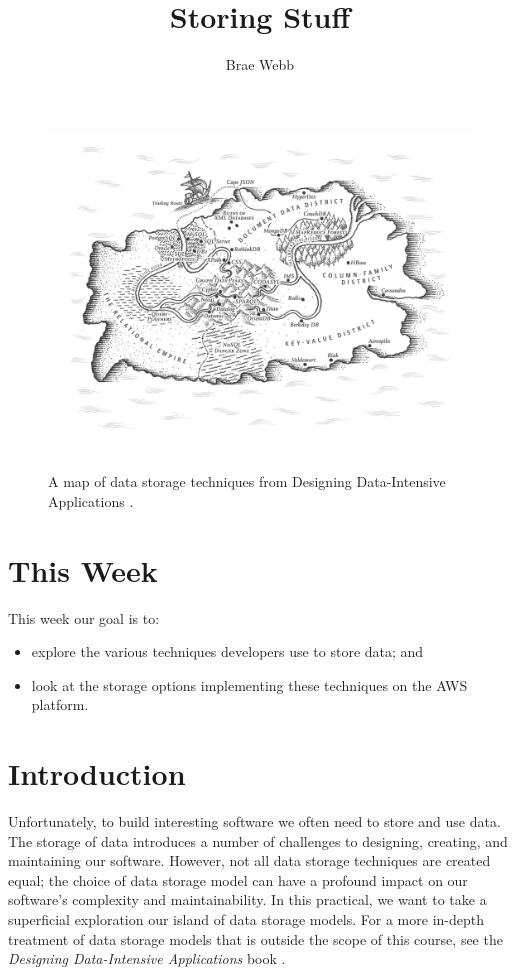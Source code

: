 \documentclass{csse4400}
\title{Storing Stuff}
\author{Brae Webb}
\date{\week{3}}
\begin{document}
\maketitle

\begin{figure}[h]
  \href{https://www.oreilly.com/library/view/designing-data-intensive-applications/9781491903063/ch02.html}{
    \includegraphics[width=\textwidth]{images/databases}
  }
\caption{A map of data storage techniques from Designing Data-Intensive Applications \cite{data-intensive}.}
\end{figure}

\section{This Week}
This week our goal is to:
\begin{itemize}
  \item explore the various techniques developers use to store data; and
  \item look at the storage options implementing these techniques on the AWS platform.
\end{itemize}

\section{Introduction}
Unfortunately, to build interesting software we often need to store and use data.
The storage of data introduces a number of challenges to designing, creating, and maintaining our software.
However, not all data storage techniques are created equal;
the choice of data storage model can have a profound impact on our software's complexity and maintainability.
In this practical, we want to take a superficial exploration our island of data storage models.
For a more in-depth treatment of data storage models that is outside the scope of this course,
see the \textit{Designing Data-Intensive Applications} book \cite{data-intensive}.
\end{document}
